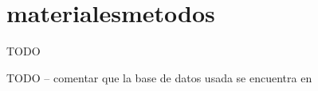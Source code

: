 \section{materialesmetodos}

TODO



TODO -- comentar que la base de datos usada se encuentra en \cite{database:online}
